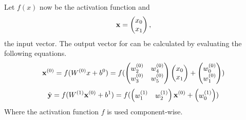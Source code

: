 Let \(f(x)\) now be the activation function and
\begin{equation}
    \mathbf{x} =
    \begin{pmatrix}
        x_0 \\
        x_1
    \end{pmatrix},
\end{equation}
the input vector.
The output vector for  can be calculated by evaluating the following equations.
\begin{equation}
    \mathbf{x}^{(0)} =
    f(W^{(0)}x + b^{0}) =
    f(
    \begin{pmatrix}
        w_{2}^{(0)} & w_{4}^{(0)} \\
        w_{3}^{(0)} & w_{5}^{(0)}
    \end{pmatrix}
    \begin{pmatrix}
        x_0 \\
        x_1
    \end{pmatrix}
    +
    \begin{pmatrix}
        w_{0}^{(0)} \\
        w_{1}^{(0)}
    \end{pmatrix}
    )
\end{equation}
\begin{equation}
    \hat{\mathbf{y}} =
    f(W^{(1)}\mathbf{x}^{(0)}+ b^{1}) =
    f(
    \begin{pmatrix}
        w_{1}^{(1)} & w_{2}^{(1)}
    \end{pmatrix}
    \mathbf{x}^{(0)}
    +
    \begin{pmatrix}
        w_{0}^{(1)}
    \end{pmatrix}
    )
\end{equation}
Where the activation function \(f\) is used component-wise.